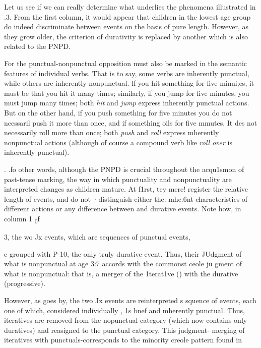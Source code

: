 Let us see if we can really determine what underlies the phenomena illustrated in .3. From the first column, it would appear that children in the lowest age group do indeed discriminate between events on the basis of pure length. However, as they grow older, the criterion of durativity is replaced by another which is also related to the PNPD.

For the punctual-nonpunctual opposition must also be marked in the semantic features of individual verbs. That is to say, some verbs are inherently punctual, while others are inherently nonpunctual. lf you hit something for five minui;es, it must be that you hit it many
times; similarly, if you jump for five minutes, you must jump many times; both \textit{hit} and \textit{jump} express inherently punctual actions. But on the other hand, if you push something for five minutes you do not ncessaril push it more than once, and if something oils for five mmutes, It des not necessarily roll more than once; both \textit{push} and \textit{roll} express mherently nonpunctual actions (although of course a compound verb like \textit{roll} \textit{over} is inherently punctual).

. .fo other words, although the PNPD is crucial throughout the acqu1smon of past-tense marking, the way in which punctuality and nonpunctuality are interpreted changes as children mature. At f1rst, tey mere! register the relative length of events, and do not ·distinguish either the. mhe.{\textquotedbl}6nt characteristics of different actions or any difference between  and durative events. Note how, in column 1 \textsubscript{0}f

\begin{table}
\caption{3, the wo Jx events, which are sequences of punctual events,}
\label{tab:3}
\end{table}

e grouped with P-10, the only truly durative event. Thus, their JUdgment of what is nonpunctual at age 3:7 accords with the common\-st ceole ju gment of what is nonpunctual: that is, a merger of the 1terat1ve () with the durative (progressive).

However, as  goes by, the two Jx events are reinterpreted s squence of events, each one of which, considered individually , 1s bnef and mherently punctual. Thus, iteratives are removed from the nopunctual category (which now contains only duratives) and re\-asigned to the punctual category. This judgment- merging of iteratives with punctuals-corresponds to the minority creole pattern found in


